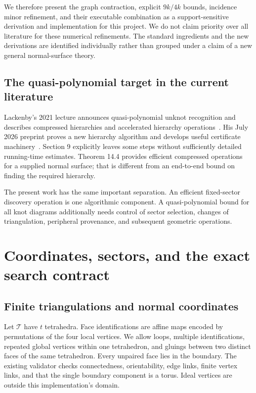\documentclass[11pt]{article}
\theoremstyle{definition}
\theoremstyle{remark}
\begin{document}
We therefore present the graph contraction, explicit $9k/4k$ bounds, incidence
minor refinement, and their executable combination as a support-sensitive
derivation and implementation for this project. We do not claim priority over
all literature for these numerical refinements. The standard ingredients and
the new derivations are identified individually rather than grouped under a
claim of a new general normal-surface theory.

\subsection{The quasi-polynomial target in the current literature}

Lackenby's 2021 lecture announces quasi-polynomial unknot recognition and
describes compressed hierarchies and accelerated hierarchy operations~\cite{slides}.
His July 2026 preprint proves a new hierarchy algorithm and develops useful
certificate machinery~\cite{lackenby2026}. Section 9 explicitly leaves some
steps without sufficiently detailed running-time estimates. Theorem 14.4
provides efficient compressed operations for a supplied normal surface; that
is different from an end-to-end bound on finding the required hierarchy.

The present work has the same important separation. An efficient fixed-sector
discovery operation is one algorithmic component. A quasi-polynomial bound for
all knot diagrams additionally needs control of sector selection, changes of
triangulation, peripheral provenance, and subsequent geometric operations.

\section{Coordinates, sectors, and the exact search contract}
\label{sec:contract}

\subsection{Finite triangulations and normal coordinates}

Let $\mathcal T$ have $t$ tetrahedra. Face identifications are affine maps encoded
by permutations of the four local vertices. We allow loops, multiple
identifications, repeated global vertices within one tetrahedron, and gluings
between two distinct faces of the same tetrahedron. Every unpaired face lies
in the boundary. The existing validator checks connectedness, orientability,
edge links, finite vertex links, and that the single boundary component is a
torus. Ideal vertices are outside this implementation's domain.
\end{document}
